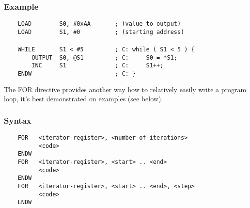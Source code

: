         \subsubsection{Example}
            \verb'    LOAD        S0, #0xAA       ; (value to output)'\\
            \verb'    LOAD        S1, #0          ; (starting address)'\\
            \verb''\\
            \verb'    WHILE       S1 < #5         ; C: while ( S1 < 5 ) {'\\
            \verb'        OUTPUT  S0, @S1         ; C:     S0 = *S1;'\\
            \verb'        INC     S1              ; C:     S1++;'\\
            \verb'    ENDW                        ; C: }'

        The FOR directive provides another way how to relatively easily write a program loop, it's best demonstrated on examples (see below).

        \subsubsection{Syntax}
            \verb'    FOR   <iterator-register>, <number-of-iterations>'\\
            \verb'          <code>'\\
            \verb'    ENDW'
            \verb''\\
            \verb'    FOR   <iterator-register>, <start> .. <end>'\\
            \verb'          <code>'\\
            \verb'    ENDW'
            \verb''\\
            \verb'    FOR   <iterator-register>, <start> .. <end>, <step>'\\
            \verb'          <code>'\\
            \verb'    ENDW'

